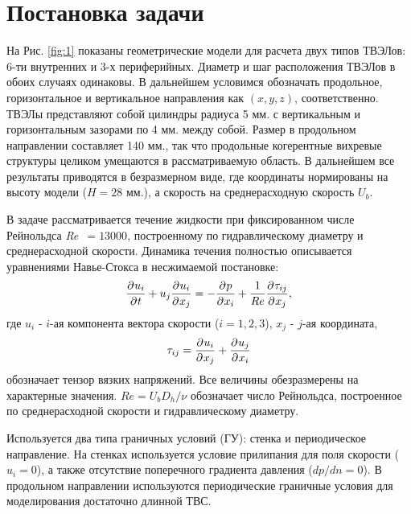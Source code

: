 \section{Постановка задачи}\label{ch4:problem}
%
На Рис. \ref{fig:1} показаны геометрические модели для расчета двух типов ТВЭЛов: 
6-ти внутренних и 3-х периферийных.
%
Диаметр и шаг расположения ТВЭЛов в обоих случаях одинаковы.
%
В дальнейшем условимся обозначать продольное, горизонтальное и 
вертикальное направления как $(x,y,z)$, соответственно.
%
ТВЭЛы представляют собой цилиндры радиуса 5 мм. с вертикальным и 
горизонтальным зазорами по 4 мм. между собой. 
%
Размер в продольном направлении составляет 140 мм., так что продольные когерентные 
вихревые структуры целиком умещаются в рассматриваемую область.
%
В дальнейшем все результаты приводятся в безразмерном виде, где координаты нормированы 
на высоту модели ($H=28$ мм.), а скорость на среднерасходную скорость $U_b$.
%


В задаче рассматривается течение жидкости при фиксированном числе 
Рейнольдса \textit{Re~}$ = 13000$, построенному по гидравлическому диаметру и среднерасходной скорости.
%
Динамика течения полностью описывается уравнениями Навье-Стокса в несжимаемой постановке:
\begin{equation}\label{n-stoks:dimen}
\pfrac{u_i}{t} + u_j \pfrac{u_i}{x_j}= - \pfrac{p}{x_i} + \frac{1}{Re} \pfrac{\tau_{ij}}{x_j},
\end{equation}
%
где $u_i$ - $i$-ая компонента вектора скорости ($i={1,2,3}$), $x_j$ - $j$-ая координата,
%
\begin{equation*}\label{stress:tensor}
\tau_{ij} = \frac{\partial\:\! u_i}{\partial\:\! x_j} + \frac{\partial\:\! u_j}{\partial\:\! x_i}
\end{equation*}
обозначает тензор вязких напряжений.
%
Все величины обезразмерены на характерные значения.
%
$Re = U_b D_h/\nu$ обозначает число Рейнольдса, построенное по среднерасходной скорости 
и гидравлическому диаметру.

%
Используется два типа граничных условий (ГУ): стенка и периодическое направление.
%
На стенках используется условие прилипания для поля скорости ($u_i = 0$), 
а также отсутствие поперечного градиента давления ($dp/dn = 0$). 
%
В продольном направлении используются периодические граничные условия для моделирования достаточно длинной ТВС.


